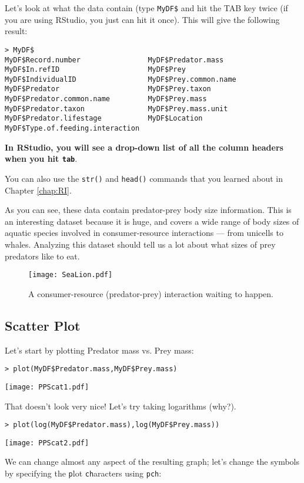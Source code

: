 Let's look at what the data contain (type {\tt MyDF\$} and hit the TAB 
key twice (if you are using RStudio, you just can hit it once). This will give the following result: 
\begin{lstlisting}
> MyDF$
MyDF$Record.number                MyDF$Predator.mass
MyDF$In.refID                     MyDF$Prey
MyDF$IndividualID                 MyDF$Prey.common.name
MyDF$Predator                     MyDF$Prey.taxon
MyDF$Predator.common.name         MyDF$Prey.mass
MyDF$Predator.taxon               MyDF$Prey.mass.unit
MyDF$Predator.lifestage           MyDF$Location
MyDF$Type.of.feeding.interaction  
\end{lstlisting}
{\bf In RStudio, you will see a drop-down list of all the column 
headers when you hit {\tt tab}}.

You can also use the {\tt str()} and {\tt head()} commands that you 
learned about in Chapter \ref{chap:RI}.

As you can see, these data contain predator-prey body size information. 
This is an interesting dataset because it is huge, and covers a wide 
range of body sizes of aquatic species involved in consumer-resource 
interactions --- from unicells to whales. Analyzing this dataset should 
tell us a lot about what sizes of prey predators like to eat.

\begin{figure} \centering
   \texttt{[image: SeaLion.pdf]} 
	 \caption{A consumer-resource (predator-prey) interaction waiting to 
	 happen.}
\end{figure}

\subsection{Scatter Plot}

Let's start by plotting Predator mass vs. Prey mass:
\begin{lstlisting}
> plot(MyDF$Predator.mass,MyDF$Prey.mass)
\end{lstlisting}
\begin{center}
   \texttt{[image: PPScat1.pdf]} 
\end{center}

That doesn't look very nice! Let's try taking logarithms (why?). 

\begin{lstlisting}
> plot(log(MyDF$Predator.mass),log(MyDF$Prey.mass))
\end{lstlisting}
\begin{center}
   \texttt{[image: PPScat2.pdf]} 
\end{center}
We can change almost any aspect of the resulting graph; let's change the
symbols by specifying the {\tt p}lot {\tt ch}aracters using {\tt pch}:

